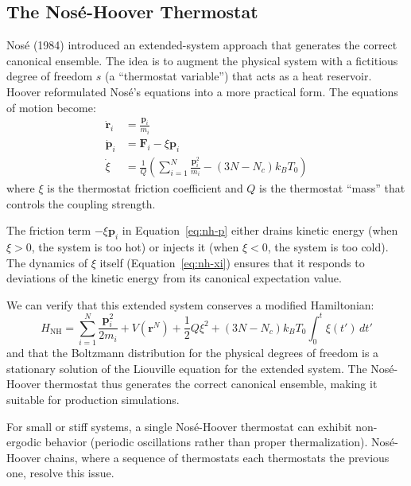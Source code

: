 \subsection{The Nos\'e-Hoover Thermostat}
\label{sec:nose-hoover}

Nos\'e (1984) introduced an extended-system approach that generates the correct canonical ensemble. The idea is to augment the physical system with a fictitious degree of freedom $s$ (a ``thermostat variable'') that acts as a heat reservoir. Hoover reformulated Nos\'e's equations into a more practical form. The equations of motion become:
\begin{align}
\label{eq:nh-r}
\dot{\mathbf{r}}_i &= \frac{\mathbf{p}_i}{m_i} \\[4pt]
\label{eq:nh-p}
\dot{\mathbf{p}}_i &= \mathbf{F}_i - \xi \mathbf{p}_i \\[4pt]
\label{eq:nh-xi}
\dot{\xi} &= \frac{1}{Q}\left(\sum_{i=1}^N \frac{\mathbf{p}_i^2}{m_i} - (3N - N_c)k_B T_0\right)
\end{align}
where $\xi$ is the thermostat friction coefficient and $Q$ is the thermostat ``mass'' that controls the coupling strength.

The friction term $-\xi\mathbf{p}_i$ in Equation~\ref{eq:nh-p} either drains kinetic energy (when $\xi > 0$, the system is too hot) or injects it (when $\xi < 0$, the system is too cold). The dynamics of $\xi$ itself (Equation~\ref{eq:nh-xi}) ensures that it responds to deviations of the kinetic energy from its canonical expectation value.

We can verify that this extended system conserves a modified Hamiltonian:
\begin{equation}
\label{eq:nh-conserved}
H_{\text{NH}} = \sum_{i=1}^N \frac{\mathbf{p}_i^2}{2m_i} + V(\mathbf{r}^N) + \frac{1}{2}Q\xi^2 + (3N-N_c)k_BT_0 \int_0^t \xi(t')\,dt'
\end{equation}
and that the Boltzmann distribution for the physical degrees of freedom is a stationary solution of the Liouville equation for the extended system. The Nos\'e-Hoover thermostat thus generates the correct canonical ensemble, making it suitable for production simulations.

For small or stiff systems, a single Nos\'e-Hoover thermostat can exhibit non-ergodic behavior (periodic oscillations rather than proper thermalization). Nos\'e-Hoover chains, where a sequence of thermostats each thermostats the previous one, resolve this issue.

